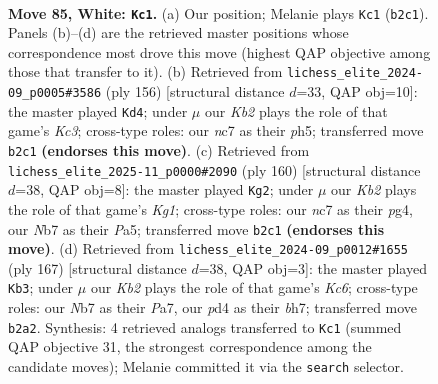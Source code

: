 \documentclass[11pt]{article}
\begin{document}
\clearpage

\begin{figure}[p]\centering
\begin{subfigure}{0.46\textwidth}\centering
\resizebox{\linewidth}{!}{%
\newchessgame
\chessboard[
  setfen={8/1Nn5/5k2/p7/Pb1pP2n/1P1B3p/1K2P3/8 w - - 36 85},
  showmover=false,
  pgfstyle=straightmove, color=movearrow, markmove={b2-c1}
]}
\caption{}
\end{subfigure}\hfill
\begin{subfigure}{0.46\textwidth}\centering
\resizebox{\linewidth}{!}{%
\newchessgame
\chessboard[
  setfen={8/8/p3pBk1/Pb2P2p/1P5P/2K5/8/8 w - - 38 79},
  showmover=false,
  pgfstyle=straightmove, color=movearrow, markmove={c3-d4}
]}
\caption{}
\end{subfigure}
\\[4pt]
\begin{subfigure}{0.46\textwidth}\centering
\resizebox{\linewidth}{!}{%
\newchessgame
\chessboard[
  setfen={8/8/8/P6p/3Bp1p1/3bP1P1/5P2/3k2K1 w - - 40 81},
  showmover=false,
  pgfstyle=straightmove, color=movearrow, markmove={g1-g2}
]}
\caption{}
\end{subfigure}\hfill
\begin{subfigure}{0.46\textwidth}\centering
\resizebox{\linewidth}{!}{%
\newchessgame
\chessboard[
  setfen={8/p1p4B/1p5p/1P5P/P4p2/2k1bP2/8/1K6 b - - 82 84},
  showmover=false,
  pgfstyle=straightmove, color=movearrow, markmove={c3-b3}
]}
\caption{}
\end{subfigure}
\caption{\textbf{Move 85, White: \texttt{Kc1}.} (a) Our position; Melanie plays \texttt{Kc1} (\texttt{b2c1}). Panels (b)--(d) are the retrieved master positions whose correspondence most drove this move (highest QAP objective among those that transfer to it). (b) Retrieved from \texttt{lichess\_elite\_2024-09\_p0005\#3586} (ply 156) [structural distance $d$=33, QAP obj=10]: the master played \texttt{Kd4}; under $\mu$ our \emph{Kb2} plays the role of that game's \emph{Kc3}; cross-type roles: our \emph{n}c7 as their \emph{p}h5; transferred move \texttt{b2c1} \textbf{(endorses this move)}. (c) Retrieved from \texttt{lichess\_elite\_2025-11\_p0000\#2090} (ply 160) [structural distance $d$=38, QAP obj=8]: the master played \texttt{Kg2}; under $\mu$ our \emph{Kb2} plays the role of that game's \emph{Kg1}; cross-type roles: our \emph{n}c7 as their \emph{p}g4, our \emph{N}b7 as their \emph{P}a5; transferred move \texttt{b2c1} \textbf{(endorses this move)}. (d) Retrieved from \texttt{lichess\_elite\_2024-09\_p0012\#1655} (ply 167) [structural distance $d$=38, QAP obj=3]: the master played \texttt{Kb3}; under $\mu$ our \emph{Kb2} plays the role of that game's \emph{Kc6}; cross-type roles: our \emph{N}b7 as their \emph{P}a7, our \emph{p}d4 as their \emph{b}h7; transferred move \texttt{b2a2}. Synthesis: 4 retrieved analogs transferred to \texttt{Kc1} (summed QAP objective 31, the strongest correspondence among the candidate moves); Melanie committed it via the \texttt{search} selector.}
\label{fig:thought-m168}
\end{figure}
\end{document}
